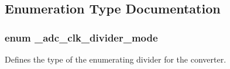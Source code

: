 \subsection{Enumeration Type Documentation}
\subsubsection[{\texorpdfstring{\+\_\+adc\+\_\+clk\+\_\+divider\+\_\+mode}{_adc_clk_divider_mode}}]{\setlength{\rightskip}{0pt plus 5cm}enum {\bf \+\_\+adc\+\_\+clk\+\_\+divider\+\_\+mode}}\hypertarget{group__adc__hal_gab7c3af47d538315640945a1a90460a08}{}\label{group__adc__hal_gab7c3af47d538315640945a1a90460a08}


Defines the type of the enumerating divider for the converter. 


